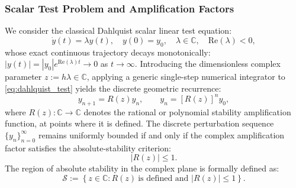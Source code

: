 \subsubsection{Scalar Test Problem and Amplification Factors}
We consider the classical Dahlquist scalar linear test equation:
\begin{equation}
\label{eq:dahlquist_test}
\dot{y}(t) = \lambda y(t), \quad y(0) = y_0, \quad \lambda \in \mathbb{C}, \quad \mathrm{Re}(\lambda) < 0,
\end{equation}
whose exact continuous trajectory decays monotonically: $|y(t)| = |y_0| e^{\mathrm{Re}(\lambda)t} \to 0$ as $t \to \infty$. Introducing the dimensionless complex parameter $z := h\lambda \in \mathbb{C}$, applying a generic single-step numerical integrator to \eqref{eq:dahlquist_test} yields the discrete geometric recurrence:
\begin{equation}
\label{eq:discrete_recurrence}
 y_{n+1} = R(z) y_n, \qquad y_n = \left[R(z)\right]^n y_0,
\end{equation}
where $R(z): \mathbb{C} \to \mathbb{C}$ denotes the rational or polynomial stability amplification function, at points where it is defined. The discrete perturbation sequence $\{y_n\}_{n=0}^\infty$ remains uniformly bounded if and only if the complex amplification factor satisfies the absolute-stability criterion:
\begin{equation}
\label{eq:stability_criterion}
|R(z)| \le 1.
\end{equation}
The region of absolute stability in the complex plane is formally defined as:
\begin{equation}
\label{eq:stability_region_def}
\mathcal{S} := \left\{ z \in \mathbb{C} : R(z)\ \text{is defined and } |R(z)| \le 1 \right\}.
\end{equation}

